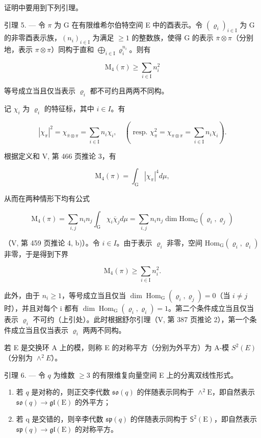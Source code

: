 证明中要用到下列引理。

引理 5. --- 令 \(\pi\) 为 G 在有限维希尔伯特空间 E 中的酉表示。令 \((\varrho_{i})_{i\in\mathrm{I}}\) 为 G 的非零酉表示族，\((n_{i})_{i\in\mathrm{I}}\) 为满足 \(\geqslant 1\) 的整数族，使得 G 的表示 \(\overline{\pi}\otimes\pi\)（分别地，表示 \(\pi\otimes\pi\)）同构于直和 \(\bigoplus_{i\in\mathrm{I}}\varrho_{i}^{n_{i}}\)。则有

\[
\mathrm{M} _ {4} (\pi) \geqslant \sum_ {i \in \mathrm{I}} n _ {i} ^ {2}
\]

等号成立当且仅当表示 \(\varrho_{i}\) 都不可约且两两不同构。

记 \(\chi_{i}\) 为 \(\varrho_{i}\) 的特征标，其中 \(i\in I\)。有

\[
| \chi_ {\pi} | ^ {2} = \chi_ {\overline {{\pi}} \otimes \pi} = \sum_ {i \in \mathrm{I}} n _ {i} \chi_ {i}, \quad (\text { resp. } \chi_ {\pi} ^ {2} = \chi_ {\pi \otimes \pi} = \sum_ {i \in \mathrm{I}} n _ {i} \chi_ {i}).
\]

根据定义和 V, 第 466 页推论 3，有

\[
\mathrm{M} _ {4} (\pi) = \int_ {\mathrm{G}} | \chi_ {\pi} | ^ {4} d \mu ,
\]

从而在两种情形下均有公式

\[
\mathrm{M} _ {4} (\pi) = \sum_ {i, j} n _ {i} n _ {j} \int_ {\mathrm{G}} \chi_ {i} \overline {{\chi}} _ {j} d \mu = \sum_ {i, j} n _ {i} n _ {j} \dim \mathrm{Hom} _ {\mathrm{G}} (\varrho_ {i}, \varrho_ {j})
\]

（V, 第 459 页推论 4, b)）。令 \(i \in I\)。由于表示 \(\varrho_{i}\) 非零，空间 \(\mathrm{Hom}_{\mathrm{G}}(\varrho_{i}, \varrho_{i})\) 非零，于是得到下界

\[
\mathrm{M} _ {4} (\pi) \geqslant \sum_ {i \in \mathrm{I}} n _ {i} ^ {2}.
\]

此外，由于 \(n_{i} \geqslant 1\)，等号成立当且仅当 \(\dim \operatorname{Hom}_{\mathrm{G}}(\varrho_{i}, \varrho_{j}) = 0\)（当 \(i \neq j\) 时），并且对每个 i 都有 \(\dim \operatorname{Hom}_{\mathrm{G}}(\varrho_{i}, \varrho_{i}) = 1\)。第二个条件成立当且仅当表示 \(\varrho_{i}\) 不可约（上引处）。此时根据舒尔引理（V, 第 387 页推论 2），第一个条件成立当且仅当表示 \(\varrho_{i}\) 两两不同构。

若 E 是交换环 A 上的模，则称 E 的对称平方（分别为外平方）为 A-模 \(S^{2}(E)\)（分别为 \(\wedge^{2}E\)）。

引理 6. --- 令 \(q\) 为维数 \(\geqslant 3\) 的有限维复向量空间 E 上的分离双线性形式。

\begin{enumerate}
\def\labelenumi{\alph{enumi})}
\item
  若 \(q\) 是对称的，则正交李代数 \(\mathfrak{so}(q)\) 的伴随表示同构于 \(\wedge^2\mathrm{E}\)，即自然表示 \(\mathfrak{so}(q) \to \mathfrak{gl}(\mathrm{E})\) 的外平方；
\item
  若 q 是交错的，则辛李代数 \(\mathfrak{sp}(q)\) 的伴随表示同构于 \(\mathsf{S}^2 (\mathrm{E})\)，即自然表示 \(\mathfrak{sp}(q)\to \mathfrak{gl}(\mathrm{E})\) 的对称平方。
\end{enumerate}


